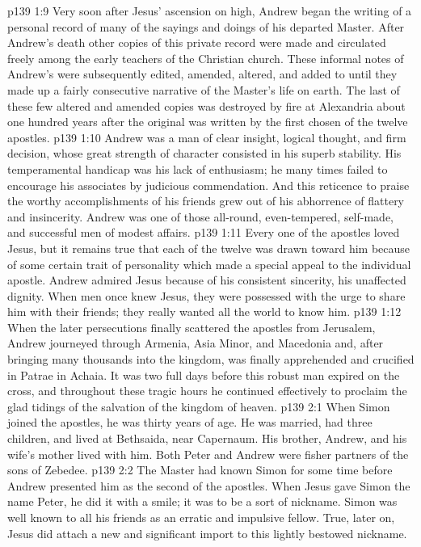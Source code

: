 \vs p139 1:9 Very soon after Jesus’ ascension on high, Andrew began the writing of a personal record of many of the sayings and doings of his departed Master. After Andrew’s death other copies of this private record were made and circulated freely among the early teachers of the Christian church. These informal notes of Andrew’s were subsequently edited, amended, altered, and added to until they made up a fairly consecutive narrative of the Master’s life on earth. The last of these few altered and amended copies was destroyed by fire at Alexandria about one hundred years after the original was written by the first chosen of the twelve apostles.
\vs p139 1:10 Andrew was a man of clear insight, logical thought, and firm decision, whose great strength of character consisted in his superb stability. His temperamental handicap was his lack of enthusiasm; he many times failed to encourage his associates by judicious commendation. And this reticence to praise the worthy accomplishments of his friends grew out of his abhorrence of flattery and insincerity. Andrew was one of those all\hyp{}round, even\hyp{}tempered, self\hyp{}made, and successful men of modest affairs.
\pc \vs p139 1:11 Every one of the apostles loved Jesus, but it remains true that each of the twelve was drawn toward him because of some certain trait of personality which made a special appeal to the individual apostle. Andrew admired Jesus because of his consistent sincerity, his unaffected dignity. When men once knew Jesus, they were possessed with the urge to share him with their friends; they really wanted all the world to know him.
\pc \vs p139 1:12 When the later persecutions finally scattered the apostles from Jerusalem, Andrew journeyed through Armenia, Asia Minor, and Macedonia and, after bringing many thousands into the kingdom, was finally apprehended and crucified in Patrae in Achaia. It was two full days before this robust man expired on the cross, and throughout these tragic hours he continued effectively to proclaim the glad tidings of the salvation of the kingdom of heaven.\plusone
{}
\vs p139 2:1 When Simon joined the apostles, he was thirty years of age. He was married, had three children, and lived at Bethsaida, near Capernaum. His brother, Andrew, and his wife’s mother lived with him. Both Peter and Andrew were fisher partners of the sons of Zebedee.
\vs p139 2:2 The Master had known Simon for some time before Andrew presented him as the second of the apostles. When Jesus gave Simon the name Peter, he did it with a smile; it was to be a sort of nickname. Simon was well known to all his friends as an erratic and impulsive fellow. True, later on, Jesus did attach a new and significant import to this lightly bestowed nickname.
